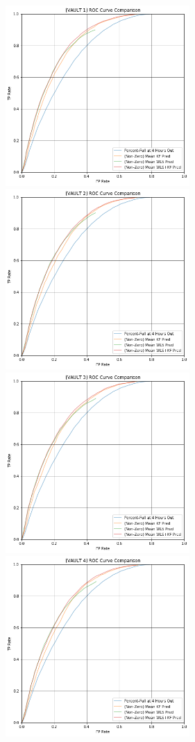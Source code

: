 \begin{figure}[h]
\centering
\includegraphics[width=7cm]{body/results/Graphs/JustSeries/1.PerformaceofMean/5.Compare/Non-Zero/v1.png}
\includegraphics[width=7cm]{body/results/Graphs/JustSeries/1.PerformaceofMean/5.Compare/Non-Zero/v2.png}
\includegraphics[width=7cm]{body/results/Graphs/JustSeries/1.PerformaceofMean/5.Compare/Non-Zero/v3.png}
\includegraphics[width=7cm]{body/results/Graphs/JustSeries/1.PerformaceofMean/5.Compare/Non-Zero/v4.png}

\end{figure}
